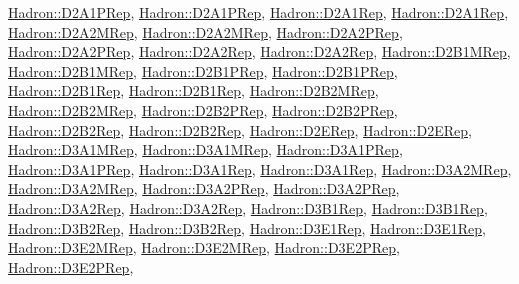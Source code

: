 \mbox{\hyperlink{structHadron_1_1D2A1PRep}{Hadron\+::\+D2\+A1\+P\+Rep}}, \mbox{\hyperlink{structHadron_1_1D2A1PRep}{Hadron\+::\+D2\+A1\+P\+Rep}}, \mbox{\hyperlink{structHadron_1_1D2A1Rep}{Hadron\+::\+D2\+A1\+Rep}}, \mbox{\hyperlink{structHadron_1_1D2A1Rep}{Hadron\+::\+D2\+A1\+Rep}}, \mbox{\hyperlink{structHadron_1_1D2A2MRep}{Hadron\+::\+D2\+A2\+M\+Rep}}, \mbox{\hyperlink{structHadron_1_1D2A2MRep}{Hadron\+::\+D2\+A2\+M\+Rep}}, \mbox{\hyperlink{structHadron_1_1D2A2PRep}{Hadron\+::\+D2\+A2\+P\+Rep}}, \mbox{\hyperlink{structHadron_1_1D2A2PRep}{Hadron\+::\+D2\+A2\+P\+Rep}}, \mbox{\hyperlink{structHadron_1_1D2A2Rep}{Hadron\+::\+D2\+A2\+Rep}}, \mbox{\hyperlink{structHadron_1_1D2A2Rep}{Hadron\+::\+D2\+A2\+Rep}}, \mbox{\hyperlink{structHadron_1_1D2B1MRep}{Hadron\+::\+D2\+B1\+M\+Rep}}, \mbox{\hyperlink{structHadron_1_1D2B1MRep}{Hadron\+::\+D2\+B1\+M\+Rep}}, \mbox{\hyperlink{structHadron_1_1D2B1PRep}{Hadron\+::\+D2\+B1\+P\+Rep}}, \mbox{\hyperlink{structHadron_1_1D2B1PRep}{Hadron\+::\+D2\+B1\+P\+Rep}}, \mbox{\hyperlink{structHadron_1_1D2B1Rep}{Hadron\+::\+D2\+B1\+Rep}}, \mbox{\hyperlink{structHadron_1_1D2B1Rep}{Hadron\+::\+D2\+B1\+Rep}}, \mbox{\hyperlink{structHadron_1_1D2B2MRep}{Hadron\+::\+D2\+B2\+M\+Rep}}, \mbox{\hyperlink{structHadron_1_1D2B2MRep}{Hadron\+::\+D2\+B2\+M\+Rep}}, \mbox{\hyperlink{structHadron_1_1D2B2PRep}{Hadron\+::\+D2\+B2\+P\+Rep}}, \mbox{\hyperlink{structHadron_1_1D2B2PRep}{Hadron\+::\+D2\+B2\+P\+Rep}}, \mbox{\hyperlink{structHadron_1_1D2B2Rep}{Hadron\+::\+D2\+B2\+Rep}}, \mbox{\hyperlink{structHadron_1_1D2B2Rep}{Hadron\+::\+D2\+B2\+Rep}}, \mbox{\hyperlink{structHadron_1_1D2ERep}{Hadron\+::\+D2\+E\+Rep}}, \mbox{\hyperlink{structHadron_1_1D2ERep}{Hadron\+::\+D2\+E\+Rep}}, \mbox{\hyperlink{structHadron_1_1D3A1MRep}{Hadron\+::\+D3\+A1\+M\+Rep}}, \mbox{\hyperlink{structHadron_1_1D3A1MRep}{Hadron\+::\+D3\+A1\+M\+Rep}}, \mbox{\hyperlink{structHadron_1_1D3A1PRep}{Hadron\+::\+D3\+A1\+P\+Rep}}, \mbox{\hyperlink{structHadron_1_1D3A1PRep}{Hadron\+::\+D3\+A1\+P\+Rep}}, \mbox{\hyperlink{structHadron_1_1D3A1Rep}{Hadron\+::\+D3\+A1\+Rep}}, \mbox{\hyperlink{structHadron_1_1D3A1Rep}{Hadron\+::\+D3\+A1\+Rep}}, \mbox{\hyperlink{structHadron_1_1D3A2MRep}{Hadron\+::\+D3\+A2\+M\+Rep}}, \mbox{\hyperlink{structHadron_1_1D3A2MRep}{Hadron\+::\+D3\+A2\+M\+Rep}}, \mbox{\hyperlink{structHadron_1_1D3A2PRep}{Hadron\+::\+D3\+A2\+P\+Rep}}, \mbox{\hyperlink{structHadron_1_1D3A2PRep}{Hadron\+::\+D3\+A2\+P\+Rep}}, \mbox{\hyperlink{structHadron_1_1D3A2Rep}{Hadron\+::\+D3\+A2\+Rep}}, \mbox{\hyperlink{structHadron_1_1D3A2Rep}{Hadron\+::\+D3\+A2\+Rep}}, \mbox{\hyperlink{structHadron_1_1D3B1Rep}{Hadron\+::\+D3\+B1\+Rep}}, \mbox{\hyperlink{structHadron_1_1D3B1Rep}{Hadron\+::\+D3\+B1\+Rep}}, \mbox{\hyperlink{structHadron_1_1D3B2Rep}{Hadron\+::\+D3\+B2\+Rep}}, \mbox{\hyperlink{structHadron_1_1D3B2Rep}{Hadron\+::\+D3\+B2\+Rep}}, \mbox{\hyperlink{structHadron_1_1D3E1Rep}{Hadron\+::\+D3\+E1\+Rep}}, \mbox{\hyperlink{structHadron_1_1D3E1Rep}{Hadron\+::\+D3\+E1\+Rep}}, \mbox{\hyperlink{structHadron_1_1D3E2MRep}{Hadron\+::\+D3\+E2\+M\+Rep}}, \mbox{\hyperlink{structHadron_1_1D3E2MRep}{Hadron\+::\+D3\+E2\+M\+Rep}}, \mbox{\hyperlink{structHadron_1_1D3E2PRep}{Hadron\+::\+D3\+E2\+P\+Rep}}, \mbox{\hyperlink{structHadron_1_1D3E2PRep}{Hadron\+::\+D3\+E2\+P\+Rep}}, 
